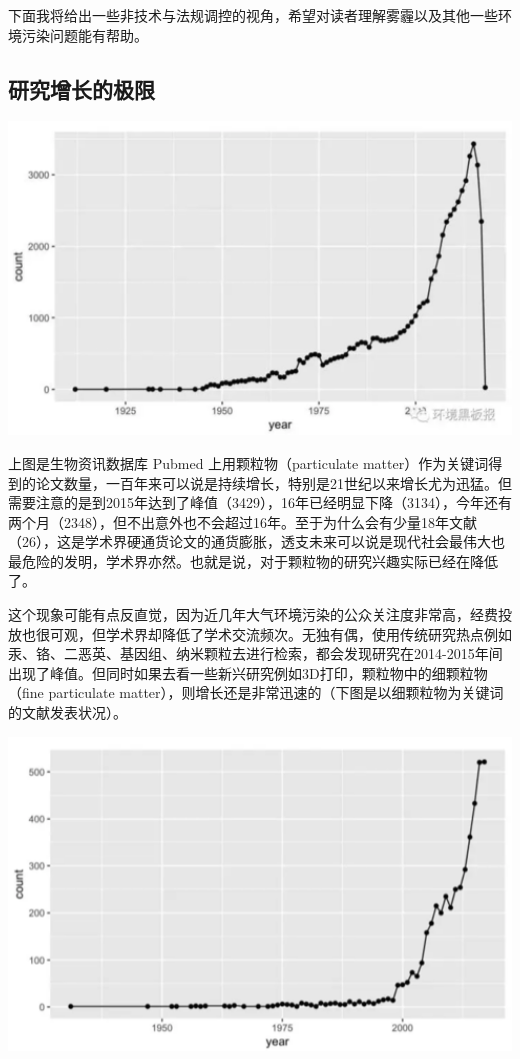 \documentclass[]{book}
\begin{document}
下面我将给出一些非技术与法规调控的视角，希望对读者理解雾霾以及其他一些环境污染问题能有帮助。

\subsection{研究增长的极限}

\includegraphics[width=6.67in]{images/cw2}

上图是生物资讯数据库 Pubmed 上用颗粒物（particulate
matter）作为关键词得到的论文数量，一百年来可以说是持续增长，特别是21世纪以来增长尤为迅猛。但需要注意的是到2015年达到了峰值（3429），16年已经明显下降（3134），今年还有两个月（2348），但不出意外也不会超过16年。至于为什么会有少量18年文献（26），这是学术界硬通货论文的通货膨胀，透支未来可以说是现代社会最伟大也最危险的发明，学术界亦然。也就是说，对于颗粒物的研究兴趣实际已经在降低了。

这个现象可能有点反直觉，因为近几年大气环境污染的公众关注度非常高，经费投放也很可观，但学术界却降低了学术交流频次。无独有偶，使用传统研究热点例如汞、铬、二恶英、基因组、纳米颗粒去进行检索，都会发现研究在2014-2015年间出现了峰值。但同时如果去看一些新兴研究例如3D打印，颗粒物中的细颗粒物（fine
particulate
matter），则增长还是非常迅速的（下图是以细颗粒物为关键词的文献发表状况）。

\includegraphics[width=6.67in]{images/cw3}
\end{document}
